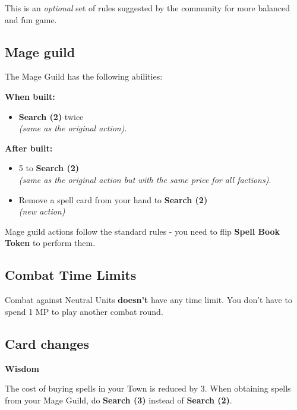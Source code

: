 
\begin{multicols*}{2}

This is an \textit{optional} set of rules suggested by the community for more balanced and fun game.

\subsection*{Mage guild}

The Mage Guild has the following abilities:

\textbf{When built:}
\begin{itemize}
    \item \textbf{Search (2)} {\spellpower} twice \\ \textit{(same as the original action)}.
\end{itemize}

\textbf{After built:}
\begin{itemize}
    \item {\pay} 5 {\gold} to \textbf{Search (2)} \spellpower \\ \textit{(same as the original action but with the same price for all factions)}.
    \item Remove a spell card from your hand to \textbf{Search (2)} {\spellpower} \\ \textit{(new action)}
\end{itemize}

Mage guild actions follow the standard rules - you need to flip \textbf{Spell Book Token} to perform them.

\subsection*{Combat Time Limits}

Combat against Neutral Units \textbf{doesn't} have any time limit. You don't have to spend 1 MP to play another combat round.

\subsection*{Card changes}

\textbf{Wisdom}

The cost of buying spells in your Town is reduced by 3. When obtaining spells from your Mage Guild, 
do \textbf{Search (3)} instead of \textbf{Search (2)}.


\end{multicols*}
